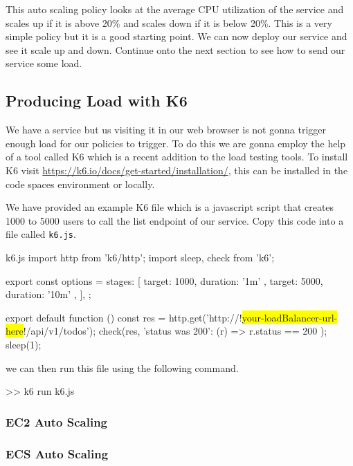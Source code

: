 \documentclass{csse4400}
\begin{document}
This auto scaling policy looks at the average CPU utilization of the service and scales up if it is above 20\% and scales down if it is below 20\%. This is a very simple policy but it is a good starting point. We can now deploy our service and see it scale up and down. Continue onto the next section to see how to send our service some load.

\subsection{Producing Load with K6}

We have a service but us visiting it in our web browser is not gonna trigger enough load for our policies to trigger. To do this we are gonna employ the help of a tool called K6 which is a recent addition to the load testing tools. To install K6 visit \url{https://k6.io/docs/get-started/installation/}, this can be installed in the code spaces environment or locally.

We have provided an example K6 file which is a javascript script that creates 1000 to 5000 users to call the list endpoint of our service. Copy this code into a file called \texttt{k6.js}.

\begin{code}[language=javascript,numbers=none,escapechar=!]{k6.js}
import http from 'k6/http';
import { sleep, check } from 'k6';

export const options = {
  stages: [
    { target: 1000, duration: '1m' },
    { target: 5000, duration: '10m' },
  ],
};

export default function () {
  const res = http.get('http://!\colorbox{yellow}{your-loadBalancer-url-here}!/api/v1/todos');
  check(res, { 'status was 200': (r) => r.status == 200 });
  sleep(1);
}
\end{code}

we can then run this file using the following command.

\begin{code}[language=bash,numbers=none]{}
>> k6 run k6.js
\end{code}

\subsubsection{EC2 Auto Scaling}


\subsubsection{ECS Auto Scaling}




\end{document}
